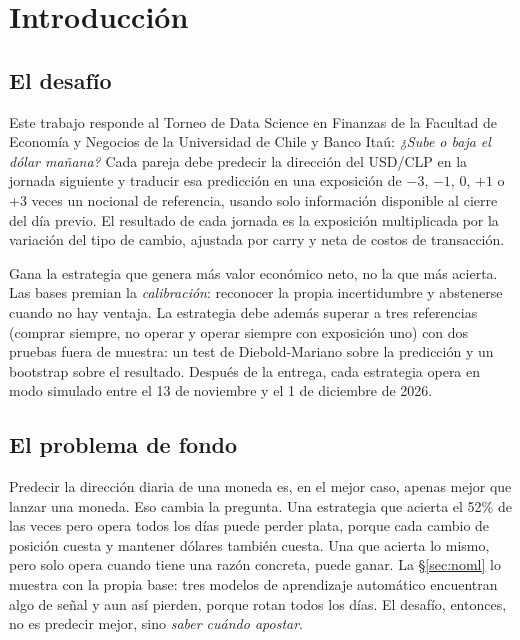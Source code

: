 \documentclass[10pt,a4paper]{article}
\begin{document}
\section{Introducción}\label{sec:intro}

\subsection{El desafío}

Este trabajo responde al Torneo de Data Science en Finanzas de la Facultad de Economía
y Negocios de la Universidad de Chile y Banco Itaú: \emph{¿Sube o baja el dólar
mañana?} Cada pareja debe predecir la dirección del USD/CLP en la jornada siguiente y
traducir esa predicción en una exposición de $-3$, $-1$, $0$, $+1$ o $+3$ veces un
nocional de referencia, usando solo información disponible al cierre del día previo.
El resultado de cada jornada es la exposición multiplicada por la variación del tipo
de cambio, ajustada por carry y neta de costos de transacción.

Gana la estrategia que genera más valor económico neto, no la que más acierta. Las
bases premian la \emph{calibración}: reconocer la propia incertidumbre y abstenerse
cuando no hay ventaja. La estrategia debe además superar a tres referencias (comprar
siempre, no operar y operar siempre con exposición uno) con dos pruebas fuera de
muestra: un test de Diebold-Mariano sobre la predicción y un bootstrap sobre el
resultado. Después de la entrega, cada estrategia opera en modo simulado entre el 13
de noviembre y el 1 de diciembre de 2026.

\subsection{El problema de fondo}

Predecir la dirección diaria de una moneda es, en el mejor caso, apenas mejor que
lanzar una moneda. Eso cambia la pregunta. Una estrategia que acierta el 52\% de las
veces pero opera todos los días puede perder plata, porque cada cambio de posición
cuesta y mantener dólares también cuesta. Una que acierta lo mismo, pero solo opera
cuando tiene una razón concreta, puede ganar. La §\ref{sec:noml} lo muestra con la
propia base: tres modelos de aprendizaje automático encuentran algo de señal y aun así
pierden, porque rotan todos los días. El desafío, entonces, no es predecir mejor, sino
\emph{saber cuándo apostar}.
\end{document}
